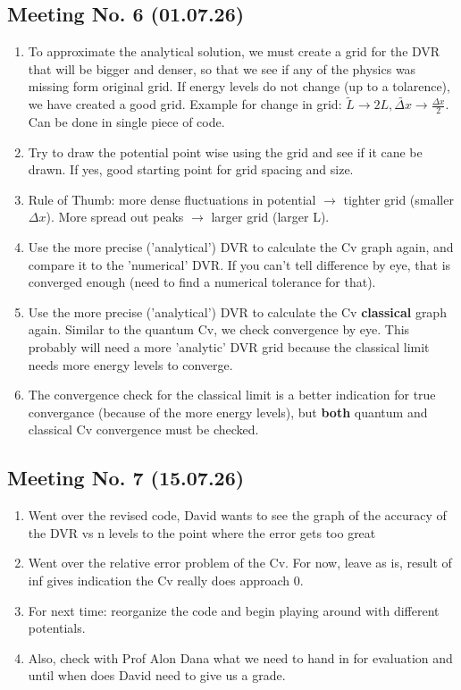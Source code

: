 \documentclass{article}
\numberwithin{equation}{subsection}
\begin{document}
\subsection*{Meeting No. 6 (01.07.26)}
\begin{enumerate}[label=\textbf{\Alph*.}]
    \item To approximate the analytical solution, we must create a grid for the DVR that will be bigger and denser, so that we see if any of the physics was missing form original grid. If energy levels do not change (up to a tolarence), we have created a good grid. Example for change in grid: $\tilde L \rightarrow 2L, \tilde{\Delta x} \rightarrow \frac{\Delta x}{2} $. Can be done in single piece of code.
    
    \item Try to draw the potential point wise using the grid and see if it cane be drawn. If yes, good starting point for grid spacing and size.
    
    \item Rule of Thumb: more dense fluctuations in potential $\rightarrow$ tighter grid (smaller $\Delta x$). 
    More spread out peaks $\rightarrow$ larger grid (larger L).
    
    \item Use the more precise ('analytical') DVR to calculate the Cv graph again, and compare it to the 'numerical' DVR. If you can't tell difference by eye, that is converged enough (need to find a numerical tolerance for that).
    
    \item Use the more precise ('analytical') DVR to calculate the Cv \textbf{classical} graph again. Similar to the quantum Cv, we check convergence by eye. This probably will need a more 'analytic' DVR grid because the classical limit needs more energy levels to converge.
    
    \item The convergence check for the classical limit is a better indication for true convergance (because of the more energy levels), but \textbf{both} quantum and classical Cv convergence must be checked.
\end{enumerate}

\subsection*{Meeting No. 7 (15.07.26)}
\begin{enumerate}[label=\textbf{\Alph*.}]
    \item Went over the revised code, David wants to see the graph of the accuracy of the DVR vs n levels to the point where the error gets too great
    \item Went over the relative error problem of the Cv. For now, leave as is, result of inf gives indication the Cv really does approach 0.
    \item For next time: reorganize the code and begin playing around with different potentials.
    \item Also, check with Prof Alon Dana what we need to hand in for evaluation and until when does David need to give us a grade.
\end{enumerate}
\end{document}
